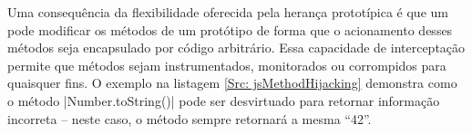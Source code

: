 


Uma consequência da flexibilidade oferecida pela herança prototípica é que um \script{} pode modificar os métodos de um protótipo de forma que o acionamento desses métodos seja encapsulado por código arbitrário. Essa capacidade de interceptação permite que métodos sejam instrumentados, monitorados ou corrompidos para quaisquer fins. O exemplo na listagem \ref{Src: jsMethodHijacking} demonstra como o método |Number.toString()| pode ser desvirtuado para retornar informação incorreta -- neste caso, o método sempre retornará a mesma  ``42''.

